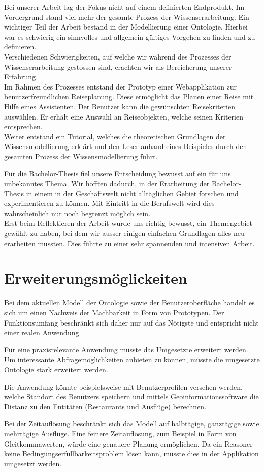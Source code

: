 Bei unserer Arbeit lag der Fokus nicht auf einem definierten Endprodukt. Im Vordergrund stand viel mehr der gesamte Prozess der Wissenserarbeitung. Ein wichtiger Teil der Arbeit bestand in der Modellierung einer Ontologie. Hierbei war es schwierig ein sinnvolles und allgemein gültiges Vorgehen zu finden und zu definieren.\\
Verschiedenen Schwierigkeiten, auf welche wir während des Prozesses der Wissenserarbeitung gestossen sind, erachten wir als Bereicherung unserer Erfahrung.\\
Im Rahmen des Prozesses entstand der Prototyp einer Webapplikation zur benutzerfreundlichen Reiseplanung. Diese ermöglicht das Planen einer Reise mit Hilfe eines Assistenten. Der Benutzer kann die gewünschten Reisekriterien auswählen. Er erhält eine Auswahl an Reiseobjekten, welche seinen Kriterien entsprechen.\\
Weiter entstand ein Tutorial, welches die theoretischen Grundlagen der Wissensmodellierung erklärt und den Leser anhand eines Beispieles durch den gesamten Prozess der Wissensmodellierung führt.

Für die Bachelor-Thesis fiel unsere Entscheidung bewusst auf ein für uns unbekanntes Thema. Wir hofften dadurch, in der Erarbeitung der Bachelor-Thesis in einem in der Geschäftswelt nicht alltäglichen Gebiet forschen und experimentieren zu können. Mit Eintritt in die Berufswelt wird dies wahrscheinlich nur noch begrenzt möglich sein.\\
Erst beim Reflektieren der Arbeit wurde uns richtig bewusst, ein Themengebiet gewählt zu haben, bei dem wir ausser einigen einfachen Grundlagen alles neu erarbeiten mussten. Dies führte zu einer sehr spannenden und intensiven Arbeit.


\section{Erweiterungsmöglickeiten}
\label{sec:fazit_subchap}
Bei dem aktuellen Modell der Ontologie sowie der Benutzeroberfläche handelt es sich um einen Nachweis der Machbarkeit in Form von Prototypen. Der Funktionsumfang beschränkt sich daher nur auf das Nötigste und entspricht nicht einer realen Anwendung.

Für eine praxisrelevante Anwendung müsste das Umgesetzte erweitert werden. Um interessante Abfragemöglichkeiten anbieten zu können, müsste die umgesetzte Ontologie stark erweitert werden.

Die Anwendung könnte beispielsweise mit Benutzerprofilen versehen werden, welche Standort des Benutzers speichern und mittels Geoinformationssoftware die Distanz zu den Entitäten (Restaurants und Ausflüge) berechnen.

Bei der Zeitauflösung beschränkt sich das Modell auf halbtägige, ganztägige sowie mehrtägige Ausflüge. Eine feinere Zeitauflösung, zum Beispiel in Form von Gleitkommawerten, würde eine genauere Planung ermöglichen. Da ein Reasoner keine Bedingungserfüllbarkeitsproblem lösen kann, müsste dies in der Applikation umgesetzt werden.
